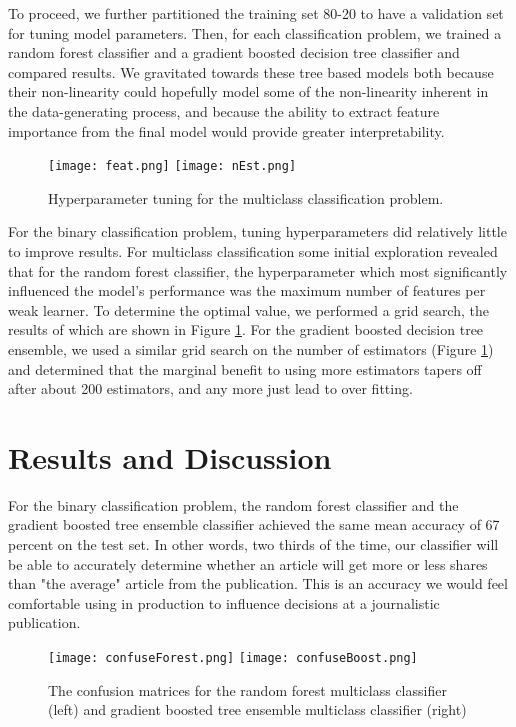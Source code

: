 \documentclass{article}
\begin{document}
To proceed, we further partitioned the training set 80-20 to have a validation set for tuning model parameters. Then, for each classification problem, we trained a random forest classifier and a gradient boosted decision tree classifier and compared results. We gravitated towards these tree based models both because their non-linearity could hopefully model some of the non-linearity inherent in the data-generating process, and because the ability to extract feature importance from the final model would provide greater interpretability.

 \begin{figure}[h!]
    \centering
    \texttt{[image: feat.png]}
    \texttt{[image: nEst.png]}
    \caption{Hyperparameter tuning for the multiclass classification problem.}
    \label{fig:hyper}
\end{figure}

For the binary classification problem, tuning hyperparameters did relatively little to improve results. For multiclass classification some initial exploration revealed that for the random forest classifier, the hyperparameter which most significantly influenced the model's performance was the maximum number of features per weak learner. To determine the optimal value, we performed a grid search, the results of which are shown in Figure \ref{fig:hyper}. For the gradient boosted decision tree ensemble, we used a similar grid search on the number of estimators (Figure \ref{fig:hyper}) and determined that the marginal benefit to using more estimators tapers off after about 200 estimators, and any more just lead to over fitting. 

\section{Results and Discussion}

For the binary classification problem, the random forest classifier and the gradient boosted tree ensemble classifier achieved the same mean accuracy of 67 percent on the test set. In other words, two thirds of the time, our classifier will be able to accurately determine whether an article will get more or less shares than "the average" article from the publication. This is an accuracy we would feel comfortable using in production to influence decisions at a journalistic publication.

\begin{figure}[h!]
    \centering
    \texttt{[image: confuseForest.png]}
    \texttt{[image: confuseBoost.png]}
    \caption{The confusion matrices for the random forest multiclass classifier (left) and gradient boosted tree ensemble multiclass classifier (right)}
    \label{fig:confuse}
\end{figure}
\end{document}
